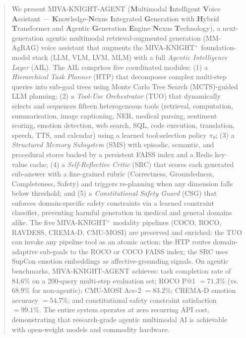 \documentclass[10pt,conference]{IEEEtran}
\theoremstyle{ieeethm}
\theoremstyle{ieeedef}
\theoremstyle{ieeeremark}
\begin{document}
\begin{abstract}
We present \textsc{MIVA-KNIGHT-AGENT} (\textbf{M}ultimodal \textbf{I}ntelligent \textbf{V}oice \textbf{A}ssistant --- \textbf{K}nowledge-\textbf{N}exus \textbf{I}ntegrated \textbf{G}eneration with \textbf{H}ybrid \textbf{T}ransformer and \textbf{A}gentic \textbf{G}eneration \textbf{E}ngine \textbf{N}exus \textbf{T}echnology), a next-generation agentic multimodal retrieval-augmented generation (MM-AgRAG) voice assistant that augments the \textsc{MIVA-KNIGHT}$^+$ foundation-model stack (LLM, VLM, LVM, MLM) with a full \emph{Agentic Intelligence Layer} (AIL). The AIL comprises five coordinated modules: (1) a \emph{Hierarchical Task Planner} (HTP) that decomposes complex multi-step queries into sub-goal trees using Monte Carlo Tree Search (MCTS)-guided LLM planning; (2) a \emph{Tool-Use Orchestrator} (TUO) that dynamically selects and sequences fifteen heterogeneous tools (retrieval, computation, summarisation, image captioning, NER, medical parsing, sentiment scoring, emotion detection, web search, SQL, code execution, translation, speech, TTS, and calendar) using a learned tool-selection policy $\pi_\theta$; (3) a \emph{Structured Memory Subsystem} (SMS) with episodic, semantic, and procedural stores backed by a persistent FAISS index and a Redis key--value cache; (4) a \emph{Self-Reflective Critic} (SRC) that scores each generated sub-answer with a fine-grained rubric (Correctness, Groundedness, Completeness, Safety) and triggers re-planning when any dimension falls below threshold; and (5) a \emph{Constitutional Safety Guard} (CSG) that enforces domain-specific safety constraints via a learned constraint classifier, preventing harmful generation in medical and general domains alike. The five \textsc{MIVA-KNIGHT}$^+$ modality pipelines (COCO, ROCO, RAVDESS, CREMA-D, CMU-MOSI) are preserved and enriched: the TUO can invoke any pipeline tool as an atomic action; the HTP routes domain-adaptive sub-goals to the ROCO or COCO FAISS index; the SRC uses SupCon emotion embeddings as affective-grounding signals. On agentic benchmarks, \textsc{MIVA-KNIGHT-AGENT} achieves: task completion rate of $84.6\%$ on a 200-query multi-step evaluation set; ROCO P@1 $= 71.3\%$ (vs. $68.9\%$ for non-agentic); CMU-MOSI Acc-2 $= 83.2\%$; CREMA-D emotion accuracy $= 54.7\%$; and constitutional safety constraint satisfaction $= 99.1\%$. The entire system operates at zero recurring API cost, demonstrating that research-grade agentic multimodal AI is achievable with open-weight models and commodity hardware.
\end{abstract}
\end{document}
